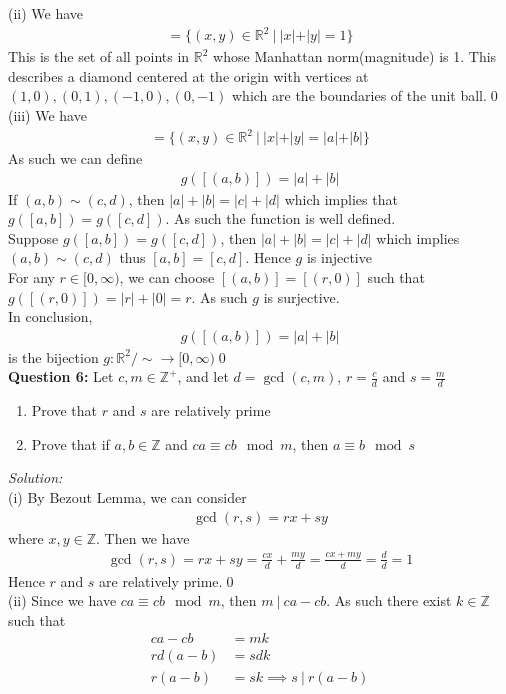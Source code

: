 \documentclass[12pt]{article}
\newcommand{\R}{\mathbb{R}}
\newcommand{\Z}{\mathbb{Z}}
\begin{document}
(ii) We have
\begin{align*}
    [(1,0)]=\{(x,y)\in\R^2\ |\ |x|+|y|=1\}
\end{align*}
This is the set of all points in $\R^2$ whose Manhattan norm(magnitude) is 1. This describes a diamond centered at the origin with vertices at $(1,0), (0,1), (-1,0), (0,-1)$ which are the boundaries of the unit ball.\qed\\[2em]
(iii) We have
\begin{align*}
    [(a,b)]=\{(x,y)\in\R^2\ |\ |x|+|y|=|a|+|b|\}
\end{align*}
As such we can define
\begin{align*}
    g([(a,b)])=|a|+|b|
\end{align*}
If $(a,b)\sim (c,d)$, then $|a|+|b|=|c|+|d|$ which implies that $g([a,b])=g([c,d])$. As such the function is well defined.\\
Suppose $g([a,b])=g([c,d])$, then $|a|+|b|=|c|+|d|$ which implies $(a,b)\sim (c,d)$ thus $[a,b]=[c,d]$. Hence $g$ is injective\\
For any $r\in[0,\infty)$, we can choose $[(a,b)]=[(r,0)]$ such that $g([(r,0)])=|r|+|0|=r$. As such $g$ is surjective. \\[2em]
In conclusion, 
\begin{align*}
    g([(a,b)])=|a|+|b|
\end{align*}
is the bijection $g:\R^2/\sim\to[0,\infty)$\qed\\[2em]
\textbf{Question 6:} Let $c,m\in\Z^+$, and let $d=\gcd(c,m)$, $r=\frac{c}{d}$ and $s=\frac{m}{d}$
\begin{enumerate}[label=\roman*)]
    \item Prove that $r$ and $s$ are relatively prime
    \item Prove that if $a,b\in\Z$ and $ca\equiv cb\mod m $, then $a\equiv b\mod s$
\end{enumerate}
\emph{Solution:}\\
(i) By Bezout Lemma, we can consider
\begin{align*}
    \gcd(r,s)=rx+sy
\end{align*}
where $x,y\in\Z$. Then we have
\begin{align*}
    \gcd(r,s)=rx+sy=\frac{cx}{d}+\frac{my}{d}=\frac{cx+my}{d}=\frac{d}{d}=1
\end{align*}
Hence $r$ and $s$ are relatively prime.\qed\\[2em]
(ii) Since we have $ca\equiv cb\mod m$, then $m\ |\ ca-cb$. As such there exist $k\in\Z$ such that
\begin{align*}
    ca-cb&=mk\\
    rd(a-b)&=sdk\\
    r(a-b)&=sk\implies s\ |\ r(a-b)
\end{align*}
\end{document}
